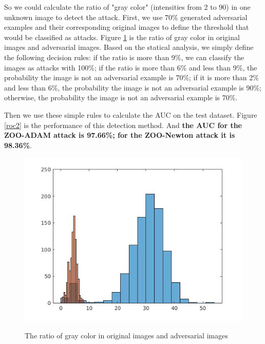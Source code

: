 \documentclass[a4paper]{article}
\begin{document}
So we could calculate the ratio of "gray color" (intensities from 2 to 90) in one unknown image to detect the attack.
First, we use 70\% generated adversarial examples and their corresponding original images to define the threshold that would be classified as attacks. Figure \ref{freq3} is the ratio of gray color in original images and adversarial images. Based on the statical analysis, we simply define the following decision rules: if the ratio is more than 9\%, we can classify the images as attacks with 100\%; if the ratio is more than 6\% and less than 9\%, the probability the image is not an adversarial example is 70\%; if it is more than 2\% and less than 6\%, the probability the image is not an adversarial example is 90\%; otherwise, the probability the image is not an adversarial example is 70\%.

Then we use these simple rules to calculate the AUC on the test dataset. Figure \ref{roc2} is the performance of this detection method.
And \textbf{the AUC for the ZOO-ADAM attack is 97.66\%; for the ZOO-Newton attack it is 98.36\%}.
\begin{figure}
\centering
\includegraphics[scale=0.5]{freq3.jpg}
\label{freq3}
\caption{The ratio of gray color in original images and adversarial images}
\end{figure}
\end{document}
